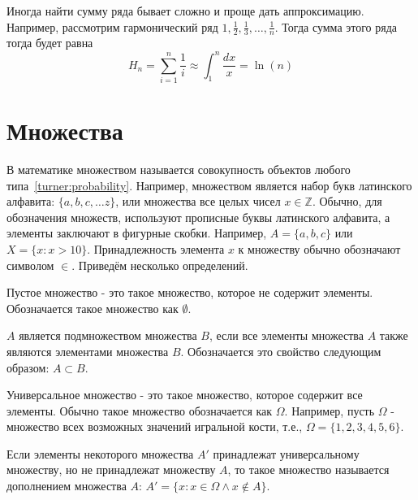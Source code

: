 Иногда найти сумму ряда бывает сложно и проще дать аппроксимацию.
Например, рассмотрим гармонический ряд $1, \frac{1}{2}, \frac{1}{3}, \ldots,\frac{1}{n}$. 
Тогда сумма этого ряда тогда будет равна $$H_n = \sum_{i=1}^n\frac{1}{i} \approx \int_1^n\frac{dx}{x} = \ln(n)$$

\section{Множества}

В математике множеством называется совокупность объектов любого типа~\ref{turner:probability}.
Например, множеством является набор букв латинского алфавита: $\{a, b, c, \ldots z\}$, или множества 
все целых чисел $x \in \mathbb{Z}$. Обычно, для обозначения множеств, используют прописные буквы 
латинского алфавита, а элементы заключают в фигурные скобки. Например, $A=\{a, b, c\}$ или 
$X=\{x: x > 10\}$. Принадлежность элемента $x$ к множеству обычно обозначают символом $\in$.
Приведём несколько определений.

\begin{definition}
Пустое множество - это такое множество, которое не содержит элементы. Обозначается
такое множество как $\emptyset$. 
\end{definition}

\begin{definition}
$A$ является подмножеством множества $B$, если все элементы
множества $A$ также являются элементами множества $B$. Обозначается это свойство следующим образом:
$A \subset B$. 
\end{definition}


\begin{definition}

Универсальное множество - это такое множество, которое содержит все 
элементы. Обычно такое множество обозначается как $\Omega$. Например, пусть $\Omega$ - множество 
всех возможных значений игральной кости, т.е., $\Omega = \{1, 2, 3, 4, 5, 6\}$. 
\end{definition}

\begin{definition}
Если элементы некоторого множества $A'$ принадлежат универсальному множеству, но не принадлежат
множеству $A$, то такое множество называется дополнением множества $A$: 
$A' = \{x: x \in \Omega \wedge x \notin A\}$.
\end{definition}

